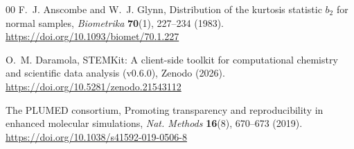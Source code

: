 \documentclass[11pt,a4paper]{article}
\begin{document}
{\begin{thebibliography}{00}
F.~J. Anscombe and W.~J. Glynn,
\newblock Distribution of the kurtosis statistic $b_2$ for normal samples,
\newblock \emph{Biometrika} \textbf{70}(1), 227--234 (1983).
\newblock \url{https://doi.org/10.1093/biomet/70.1.227}

O.~M. Daramola,
\newblock STEMKit: A client-side toolkit for computational chemistry and
  scientific data analysis (v0.6.0), Zenodo (2026).
\newblock \url{https://doi.org/10.5281/zenodo.21543112}

The PLUMED consortium,
\newblock Promoting transparency and reproducibility in enhanced molecular
  simulations,
\newblock \emph{Nat. Methods} \textbf{16}(8), 670--673 (2019).
\newblock \url{https://doi.org/10.1038/s41592-019-0506-8}

\end{thebibliography}
}
\end{document}
